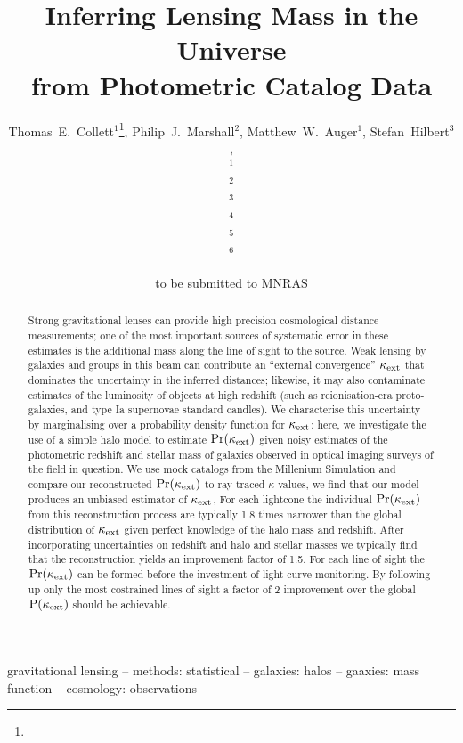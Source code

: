 \documentclass[useAMS,usenatbib]{mn2e}
\title[Line of Sight Mass Reconstruction]
{Inferring Lensing Mass in the Universe \\
from Photometric Catalog Data}
\author[Collett \etal]{%
  Thomas~E.~Collett$^{1}$\thanks{\collettemail},
  Philip~J.~Marshall$^{2}$,
  Matthew~W.~Auger$^{1}$,
  Stefan~Hilbert$^{3}$,
\newauthor{%
  Sherry~H.~Suyu$^{4}$,
  Zachary~Greene$^{4}$,
  Tommaso~Treu$^{4}$\thanks{\packard},
  Christopher~D.~Fassnacht$^{5}$,}
\newauthor{%
  L\`eon~V.~E.~Koopmans$^{6}$,
  Roger~D.~Blandford$^{3}$} 
  \medskip\\
  $^1$\ioa\\
  $^2$\oxford\\
  $^3$\kipac\\
  $^4$\ucsb\\
  $^5$\davis\\
  $^6$\kapteyn
}
\begin{document}
             
\date{to be submitted to MNRAS}
\pagerange{\pageref{firstpage}--\pageref{lastpage}}

\maketitle           

\label{firstpage}


\begin{abstract} 

Strong gravitational lenses can provide high precision cosmological distance
measurements; one of the most important sources of systematic error in these
estimates is the additional mass along the line of sight to the source. Weak
lensing by galaxies and groups in this beam can contribute an ``external
convergence'' $\kappa_{\rm ext}$ that dominates the  uncertainty in the inferred
distances; likewise, it may also contaminate estimates of the luminosity of
objects at high redshift (such as reionisation-era proto-galaxies, and type Ia
supernovae standard candles).  We characterise this uncertainty by marginalising
over a probability density function for $\kappa_{\rm ext}$: here, we investigate the use
of a simple halo model to estimate $\Pr(\kappa_{\rm ext})$ given noisy estimates of the
photometric redshift and stellar mass of galaxies observed in optical imaging
surveys of the field in question. We use mock catalogs from the Millenium
Simulation and compare our reconstructed $\Pr(\kappa_{\rm ext})$ to ray-traced $\kappa$ values,
we find that our model produces an unbiased estimator of $\kappa_{\rm ext}$,
For each lightcone the individual $\Pr(\kappa_{\rm ext})$ from this reconstruction process are
typically 1.8 times narrower than the global distribution of $\kappa_{\rm ext}$ given perfect knowledge 
of the halo mass and redshift. After incorporating uncertainties on redshift and halo and stellar masses
we typically find that the reconstruction yields an improvement factor of 1.5. For each line of sight the
 $\Pr(\kappa_{\rm ext})$ can be formed before the investment of light-curve monitoring. By following up only the 
most costrained lines of sight a factor of 2 improvement over the global ${\rm P}(\kappa_{\rm ext})$ should be 
achievable.
\end{abstract}


\begin{keywords}
  gravitational lensing   --
  methods: statistical    --
  galaxies: halos         --
  gaaxies: mass function  --
  cosmology: observations
\end{keywords}
\end{document}
